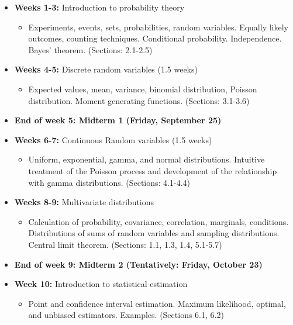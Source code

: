 \documentclass[10pt]{article}
\begin{document}
\begin{itemize}
  \item \textbf{Weeks 1-3:} Introduction to probability theory 
  \begin{itemize}
    \item Experiments, events, sets, probabilities, random variables. Equally likely outcomes, counting
    techniques. Conditional probability. Independence. Bayes' theorem. (Sections: 2.1-2.5)
  \end{itemize}
  \item \textbf{Weeks 4-5:} Discrete random variables (1.5 weeks)
  \begin{itemize}
    \item Expected values, mean, variance, binomial distribution, Poisson
    distribution. Moment generating functions. (Sections: 3.1-3.6)
  \end{itemize}
  \item \textbf{End of week 5: Midterm 1 (Friday, September 25)}
  \item \textbf{Weeks 6-7:} Continuous Random variables (1.5 weeks)
  \begin{itemize}
    \item Uniform, exponential, gamma, and normal distributions.
    Intuitive treatment of the Poisson process and development of the relationship with gamma
    distributions. (Sections: 4.1-4.4)
  \end{itemize}
  \item \textbf{Weeks 8-9:} Multivariate distributions
  \begin{itemize}
    \item Calculation of probability, covariance, correlation, marginals, conditions. Distributions of
    sums of random variables and sampling distributions. Central limit theorem. (Sections: 1.1, 1.3, 1.4, 5.1-5.7)
  \end{itemize}
  \item \textbf{End of week 9: Midterm 2 (Tentatively: Friday, October 23)}
  
  \item \textbf{Week 10:} Introduction to statistical estimation
  \begin{itemize}
    \item Point and confidence interval estimation. Maximum likelihood, optimal, and unbiased estimators.
    Examples. (Sections 6.1, 6.2)
  \end{itemize}
  

\end{itemize}
\end{document}
